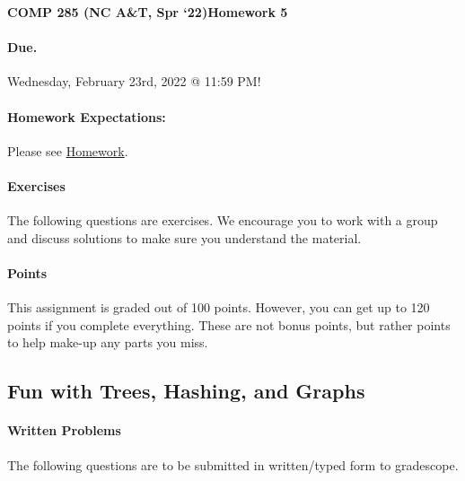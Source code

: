 \documentclass [12pt]{article}
\begin{document}
 

{\LARGE \textbf {COMP 285 (NC A\&T, Spr `22)}\hfill \textbf {Homework 5} } 
\vspace {1em} 
\begin{Instruction} 

\paragraph {Due.} Wednesday, February 23rd, 2022 @ 11:59 PM!
\end{Instruction} 

\vspace {1em} 
\begin{Instruction} \paragraph {Homework Expectations:} Please see \href{https://www.comp285.ml/homework/#general-homework-information}{Homework}.
\end{Instruction}

\vspace {1em} 
\begin{Instruction} 

\paragraph {Exercises} The following questions are exercises. We encourage you to work with a group and discuss solutions to make sure you understand the material.

\paragraph {Points} This assignment is graded out of 100 points. However, you can get up to 120 points if you complete everything. These are not bonus points, but rather points to help make-up any parts you miss.

\end{Instruction} 

\begin{centering}
\section*{Fun with Trees, Hashing, and Graphs}
\end{centering}

\begin{Instruction}

\paragraph{Written Problems} The following questions are to be submitted in written/typed form to gradescope.

\end{Instruction}
\end{document}
